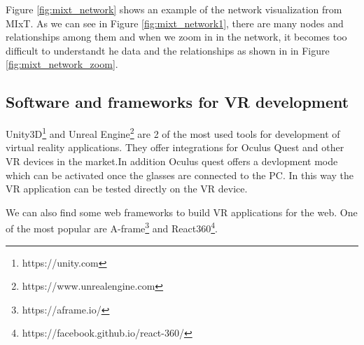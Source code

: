 Figure \ref{fig:mixt_network} shows an example of the network visualization from MIxT. As we can see in Figure \ref{fig:mixt_network1}, there are many nodes and relationships among them and when we zoom in in the network, it becomes too difficult to understandt he data and the relationships as shown in in Figure \ref{fig:mixt_network_zoom}.

\subsection{Software and frameworks for VR development}
Unity3D\footnote{https://unity.com} and Unreal Engine\footnote{https://www.unrealengine.com} are 2 of the most used tools for development of virtual reality applications. They offer integrations for Oculus Quest and other VR devices in the market.In addition Oculus quest offers a devlopment mode which can be activated once the glasses are connected to the PC. In this way the VR application can be tested directly on the VR device.

We can also find some web frameworks to build VR applications for the web. One of the most popular are A-frame\footnote{https://aframe.io/} and React360\footnote{https://facebook.github.io/react-360/}.
